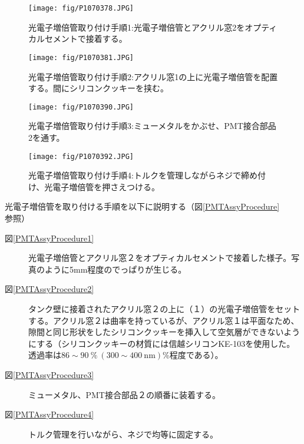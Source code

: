\documentclass[11pt]{ltjsreport}
\newcommand{\figref}[1]{図\ref{#1}}
\begin{document}
\begin{figure}[htbp]
\begin{minipage}{0.47\textwidth}
\centering
\texttt{[image: fig/P1070378.JPG]}
\caption[光電子増倍管取り付け手順1]{光電子増倍管取り付け手順1:光電子増倍管とアクリル窓2をオプティカルセメントで接着する。}
\label{SetPMTTest}
\end{minipage}
\hfil%
\begin{minipage}{0.47\textwidth}
\centering
\texttt{[image: fig/P1070381.JPG]}
\caption[光電子増倍管取り付け手順2]{光電子増倍管取り付け手順2:アクリル窓1の上に光電子増倍管を配置する。間にシリコンクッキーを挟む。}
\label{SetPMTTest}
\end{minipage}
\end{figure}
%
\begin{figure}[htbp]
\begin{minipage}{0.47\textwidth}
\centering
\texttt{[image: fig/P1070390.JPG]}
\caption[光電子増倍管取り付け手順3]{光電子増倍管取り付け手順3:ミューメタルをかぶせ、PMT接合部品2を通す。}
\label{SetPMTTest}
\end{minipage}
\hfil%
\begin{minipage}{0.47\textwidth}
\centering
\texttt{[image: fig/P1070392.JPG]}
\caption[光電子増倍管取り付け手順4]{光電子増倍管取り付け手順4:トルクを管理しながらネジで締め付け、光電子増倍管を押さえつける。}
\label{SetPMTTest}
\end{minipage}
\end{figure}
\fi

光電子増倍管を取り付ける手順を以下に説明する（\figref{PMTAssyProcedure}参照）
\begin{description}
\item[\figref{PMTAssyProcedure1}] 光電子増倍管とアクリル窓２をオプティカルセメントで接着した様子。写真のように5mm程度のでっぱりが生じる。
\item[\figref{PMTAssyProcedure2}] タンク壁に接着されたアクリル窓２の上に（１）の光電子増倍管をセットする。アクリル窓２は曲率を持っているが、アクリル窓１は平面なため、隙間と同じ形状をしたシリコンクッキーを挿入して空気層ができないようにする（シリコンクッキーの材質には信越シリコンKE-103を使用した。透過率は$86\sim90\ \%\ (300\sim400\ \mathrm{nm})$\%程度である）。
\item[\figref{PMTAssyProcedure3}] ミューメタル、PMT接合部品２の順番に装着する。
\item[\figref{PMTAssyProcedure4}] トルク管理を行いながら、ネジで均等に固定する。
\end{description}
\end{document}
